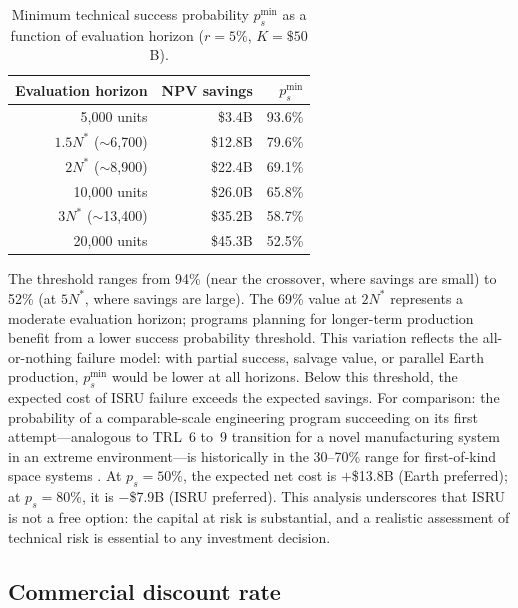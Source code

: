 \documentclass[preprint,12pt]{elsarticle}
\begin{document}
\begin{table}[htbp]
\centering
\caption{Minimum technical success probability $p_s^{\min}$ as a function of evaluation horizon ($r = 5\%$, $K = \$50$B).}
\label{tab:ps_horizon}
\small
\begin{tabular}{@{}rrr@{}}
\toprule
Evaluation horizon & NPV savings & $p_s^{\min}$ \\
\midrule
5{,}000 units            & \$3.4B   & 93.6\% \\
$1.5 N^*$ ($\sim$6{,}700) & \$12.8B  & 79.6\% \\
$2 N^*$ ($\sim$8{,}900)   & \$22.4B  & 69.1\% \\
10{,}000 units           & \$26.0B  & 65.8\% \\
$3 N^*$ ($\sim$13{,}400)  & \$35.2B  & 58.7\% \\
20{,}000 units           & \$45.3B  & 52.5\% \\
\bottomrule
\end{tabular}
\end{table}

The threshold ranges from 94\% (near the crossover, where savings are small) to 52\% (at $5N^*$, where savings are large). The 69\% value at $2N^*$ represents a moderate evaluation horizon; programs planning for longer-term production benefit from a lower success probability threshold. This variation reflects the all-or-nothing failure model: with partial success, salvage value, or parallel Earth production, $p_s^{\min}$ would be lower at all horizons. Below this threshold, the expected cost of ISRU failure exceeds the expected savings. For comparison: the probability of a comparable-scale engineering program succeeding on its first attempt---analogous to TRL~6 to~9 transition for a novel manufacturing system in an extreme environment---is historically in the 30--70\% range for first-of-kind space systems \cite{wertz2011}. At $p_s = 50\%$, the expected net cost is $+$\$13.8B (Earth preferred); at $p_s = 80\%$, it is $-$\$7.9B (ISRU preferred). This analysis underscores that ISRU is not a free option: the capital at risk is substantial, and a realistic assessment of technical risk is essential to any investment decision.

\subsection{Commercial discount rate}
\label{sec:commercial_rate}
\end{document}
